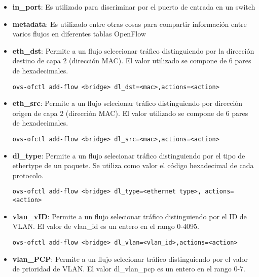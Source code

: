 \begin{itemize}

\item \textbf{in\_port}: Es utilizado para discriminar por el puerto de entrada en un switch

\item \textbf{metadata}: Es utilizado entre otras cosas para compartir informaci\'on entre varios flujos en diferentes tablas OpenFlow

\item \textbf{eth\_dst}: Permite a un flujo seleccionar tr\'afico distinguiendo por la direcci\'on destino de capa 2 (dirección MAC). El valor utilizado se compone de 6 pares de hexadecimales.

\begin{center}
\texttt{ovs-ofctl add-flow <bridge> dl\_dst=<mac>,actions=<action>}
\end{center}

\item \textbf{eth\_src}: Permite a un flujo selecionar tr\'afico distinguiendo por direcci\'on origen de capa 2 (direcci\'on MAC). El valor utilizado se compone de 6 pares de hexadecimales.

\begin{center}
\texttt{ovs-ofctl add-flow <bridge> dl\_src=<mac>,actions=<action>}
\end{center}

\item \textbf{dl\_type}: Permite a un flujo selecionar tr\'afico distinguiendo por el tipo de ethertype de un paquete. Se utiliza como valor el c\'odigo hexadecimal de cada protocolo.

\begin{center}
\texttt{ovs-ofctl add-flow <bridge> dl\_type=<ethernet type>, actions=<action>}
\end{center}

\item \textbf{vlan\_vID}: Permite a un flujo selecionar tr\'afico distinguiendo por el ID de VLAN. El valor de vlan\_id es un entero en el rango 0-4095.

\begin{center}
\texttt{ovs-ofctl add-flow <bridge> dl\_vlan=<vlan\_id>,actions=<action>}
\end{center}

\item \textbf{vlan\_PCP}: Permite a un flujo selecionar tr\'afico distinguiendo por el valor de prioridad de VLAN. El valor dl\_vlan\_pcp es un entero en el rango 0-7.


\end{itemize}
